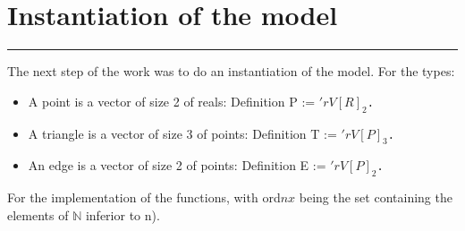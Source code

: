 \documentclass[a4paper,10pt]{article}
\def\definition#1#2{{\color{purple}Definition} {\color{blue}#1} := {\tt #2}}
\begin{document}
\section{Instantiation of the model}
\rule{\linewidth}{0.5pt}
\label{implementation}
The next step of the work was to do an instantiation of the model. For the types:
\begin{itemize}
\item A point is a vector of size 2 of reals: \definition{P}{$'rV[R]_2$. }
\item A triangle is a vector of size 3 of points: \definition{T}{$'rV[P]_3$. }
\item An edge is a vector of size 2 of points: \definition{E}{$'rV[P]_2$. }
\end{itemize}
For the implementation of the functions, with ord$nx$ being the set containing the elements of $\mathbb{N}$ inferior to n).
\end{document}
